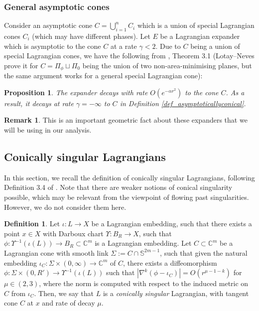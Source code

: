 \documentclass[10pt, a4paper]{article}
\theoremstyle{plain}%
\newtheorem{prop}[theorem]{Proposition}
\theoremstyle{definition}
\newtheorem{defn}[theorem]{Definition}
\newtheorem{rem}[theorem]{Remark}
\numberwithin{figure}{section}
\numberwithin{equation}{section}
\newcommand{\bC}{\mathbb{C}}
\newcommand{\bS}{\mathbb{S}}
\newcommand{\rt}{\rightarrow}
\begin{document}
\subsubsection{General asymptotic cones}
Consider an asymptotic cone $C=\bigcup_{i=1}^n C_i$ which is a union of special Lagrangian cones $C_i$ (which may have different phases). Let $E$ be a Lagrangian expander which is asymptotic to the cone $C$ at a rate $\gamma <2$. Due to $C$ being a union of special Lagrangian cones, we have the following from \cite{LN13}, Theorem 3.1 (Lotay--Neves prove it for $C=\Pi_\phi\sqcup \Pi_0$ being the union of two non-area-minimising planes, but the same argument works for a general special Lagrangian cone):
\begin{prop}\label{prop_expanderdecay}
	The expander decays with rate $O(e^{-\alpha r^2})$ to the cone $C$. As a result, it decays at rate  $\gamma= -\infty$ to $C$ in Definition \ref{def_asymptoticallyconical}.
\end{prop}

\begin{rem}
	This is an important geometric fact about these expanders that we will be using in our analysis. 
\end{rem}

\subsection{Conically singular Lagrangians}
In this section, we recall the definition of conically singular Lagrangians, following Definition 3.4 of \cite{Joy04}. Note that there are weaker notions of conical singularity possible, which may be relevant from the viewpoint of flowing past singularities. However, we do not consider them here.

\begin{defn}
	Let $\iota:L\rt X$ be a Lagrangian embedding, such that there exists a point $x\in X$ with Darboux chart $\Upsilon: B_R\rt X$, such that $\phi: \Upsilon^{-1}(\iota (L)) \rt B_R \subset \bC^m$ is a Lagrangian embedding.  Let $C\subset \bC^m$ be a Lagrangian cone with smooth link $\Sigma:= C\cap \bS^{2m-1}$, such that given the natural embedding $\iota_C: \Sigma \times (0,\infty) \rt \bC^m$ of $C$, there exists a diffeomorphism $\phi: \Sigma\times (0,R')\rt \Upsilon^{-1}(\iota(L))$ such that $|\nabla^k(\phi-\iota_C)|=O(r^{\mu-1-k})$ for $\mu \in (2,3)$, where the norm is computed with respect to the induced metric on $C$ from $\iota_C$. Then, we say that $L$ is a \textit{conically singular} Lagrangian, with tangent cone $C$ at $x$ and rate of decay $\mu$. 
\end{defn} 
\end{document}
